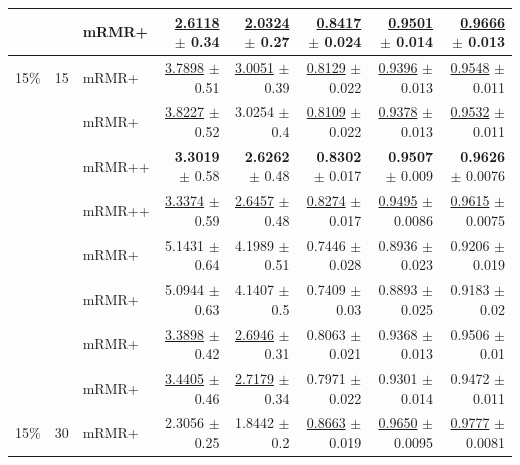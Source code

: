 \begin{longtable}{llp{}rrrrr}
 &  & mRMR+ & \underline{2.6118} {\scriptsize $\pm$ 0.34} & \underline{2.0324} {\scriptsize $\pm$ 0.27} & \underline{0.8417} {\scriptsize $\pm$ 0.024} & \underline{0.9501} {\scriptsize $\pm$ 0.014} & \underline{0.9666} {\scriptsize $\pm$ 0.013} \\
\midrule
15\% & 15 & mRMR+ & \underline{3.7898} {\scriptsize $\pm$ 0.51} & \underline{3.0051} {\scriptsize $\pm$ 0.39} & \underline{0.8129} {\scriptsize $\pm$ 0.022} & \underline{0.9396} {\scriptsize $\pm$ 0.013} & \underline{0.9548} {\scriptsize $\pm$ 0.011} \\
 &  & mRMR+ & \underline{3.8227} {\scriptsize $\pm$ 0.52} & 3.0254 {\scriptsize $\pm$ 0.4} & \underline{0.8109} {\scriptsize $\pm$ 0.022} & \underline{0.9378} {\scriptsize $\pm$ 0.013} & \underline{0.9532} {\scriptsize $\pm$ 0.011} \\
 &  & mRMR++ & \textbf{3.3019} {\scriptsize $\pm$ 0.58} & \textbf{2.6262} {\scriptsize $\pm$ 0.48} & \textbf{0.8302} {\scriptsize $\pm$ 0.017} & \textbf{0.9507} {\scriptsize $\pm$ 0.009} & \textbf{0.9626} {\scriptsize $\pm$ 0.0076} \\
 &  & mRMR++ & \underline{3.3374} {\scriptsize $\pm$ 0.59} & \underline{2.6457} {\scriptsize $\pm$ 0.48} & \underline{0.8274} {\scriptsize $\pm$ 0.017} & \underline{0.9495} {\scriptsize $\pm$ 0.0086} & \underline{0.9615} {\scriptsize $\pm$ 0.0075} \\
 &  & mRMR+ & 5.1431 {\scriptsize $\pm$ 0.64} & 4.1989 {\scriptsize $\pm$ 0.51} & 0.7446 {\scriptsize $\pm$ 0.028} & 0.8936 {\scriptsize $\pm$ 0.023} & 0.9206 {\scriptsize $\pm$ 0.019} \\
 &  & mRMR+ & 5.0944 {\scriptsize $\pm$ 0.63} & 4.1407 {\scriptsize $\pm$ 0.5} & 0.7409 {\scriptsize $\pm$ 0.03} & 0.8893 {\scriptsize $\pm$ 0.025} & 0.9183 {\scriptsize $\pm$ 0.02} \\
 &  & mRMR+ & \underline{3.3898} {\scriptsize $\pm$ 0.42} & \underline{2.6946} {\scriptsize $\pm$ 0.31} & 0.8063 {\scriptsize $\pm$ 0.021} & 0.9368 {\scriptsize $\pm$ 0.013} & 0.9506 {\scriptsize $\pm$ 0.01} \\
 &  & mRMR+ & \underline{3.4405} {\scriptsize $\pm$ 0.46} & \underline{2.7179} {\scriptsize $\pm$ 0.34} & 0.7971 {\scriptsize $\pm$ 0.022} & 0.9301 {\scriptsize $\pm$ 0.014} & 0.9472 {\scriptsize $\pm$ 0.011} \\
\midrule
15\% & 30 & mRMR+ & 2.3056 {\scriptsize $\pm$ 0.25} & 1.8442 {\scriptsize $\pm$ 0.2} & \underline{0.8663} {\scriptsize $\pm$ 0.019} & \underline{0.9650} {\scriptsize $\pm$ 0.0095} & \underline{0.9777} {\scriptsize $\pm$ 0.0081} \\

\end{longtable}
